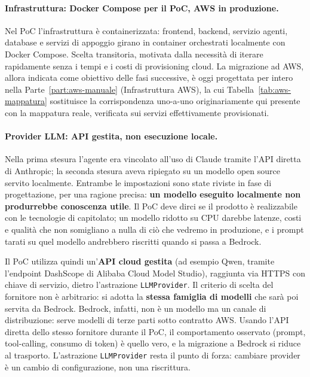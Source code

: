 \documentclass[11pt,a4paper]{article}
\begin{document}
\paragraph{Infrastruttura: Docker Compose per il PoC, AWS in produzione.} Nel PoC l'infrastruttura è containerizzata: frontend, backend, servizio agenti, database e servizi di appoggio girano in container orchestrati localmente con Docker Compose. Scelta transitoria, motivata dalla necessità di iterare rapidamente senza i tempi e i costi di provisioning cloud. La migrazione ad AWS, allora indicata come obiettivo delle fasi successive, è oggi progettata per intero nella Parte~\ref{part:aws-manuale} (Infrastruttura AWS), la cui Tabella~\ref{tab:aws-mappatura} sostituisce la corrispondenza uno-a-uno originariamente qui presente con la mappatura reale, verificata sui servizi effettivamente provisionati.

\paragraph{Provider LLM: API gestita, non esecuzione locale.} Nella prima stesura l'agente era vincolato all'uso di Claude tramite l'API diretta di Anthropic; la seconda stesura aveva ripiegato su un modello open source servito localmente. Entrambe le impostazioni sono state riviste in fase di progettazione, per una ragione precisa: \textbf{un modello eseguito localmente non produrrebbe conoscenza utile}. Il PoC deve dirci se il prodotto è realizzabile con le tecnologie di capitolato; un modello ridotto su CPU darebbe latenze, costi e qualità che non somigliano a nulla di ciò che vedremo in produzione, e i prompt tarati su quel modello andrebbero riscritti quando si passa a Bedrock.

Il PoC utilizza quindi un'\textbf{API cloud gestita} (ad esempio Qwen, tramite l'endpoint DashScope di Alibaba Cloud Model Studio), raggiunta via HTTPS con chiave di servizio, dietro l'astrazione \texttt{LLMProvider}. Il criterio di scelta del fornitore non è arbitrario: si adotta la \textbf{stessa famiglia di modelli} che sarà poi servita da Bedrock. Bedrock, infatti, non è un modello ma un canale di distribuzione: serve modelli di terze parti sotto contratto AWS. Usando l'API diretta dello stesso fornitore durante il PoC, il comportamento osservato (prompt, tool-calling, consumo di token) è quello vero, e la migrazione a Bedrock si riduce al trasporto. L'astrazione \texttt{LLMProvider} resta il punto di forza: cambiare provider è un cambio di configurazione, non una riscrittura.
\end{document}
